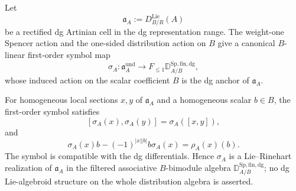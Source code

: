 \begin{construction}
\label{con:as-cellwise-spencer-symbol}
Let
\[
    \mathfrak a_A
    :=
    D_{B/R}^{\mathrm{Lie}}(A)
\]
be a rectified dg Artinian cell in the dg representation range.  The
weight-one Spencer action and the one-sided distribution action on $B$ give a
canonical $B$-linear first-order symbol map
\[
\boxed{
    \sigma_A:
    \mathfrak a_A^{\mathrm{und}}
    \longrightarrow
    F_{\le1}
    \mathbb D_{A/B}^{\mathrm{Sp,fin,dg}},
}
\]
whose induced action on the scalar coefficient $B$ is the dg anchor of
$\mathfrak a_A$.
\end{construction}

\begin{proposition}
\label{prop:as-binary-hurewicz-convolution}
For homogeneous local sections $x,y$ of $\mathfrak a_A$ and a homogeneous
scalar $b\in B$, the first-order symbol satisfies
\[
\boxed{
    [\sigma_A(x),\sigma_A(y)]
    =
    \sigma_A([x,y]),
}
\]
and
\[
\boxed{
    \sigma_A(x)b
    -
    (-1)^{|x||b|}b\sigma_A(x)
    =
    \rho_A(x)(b).
}
\]
The symbol is compatible with the dg differentials.  Hence $\sigma_A$ is a
Lie--Rinehart realization of $\mathfrak a_A$ in the filtered associative
$B$-bimodule algebra
$\mathbb D_{A/B}^{\mathrm{Sp,fin,dg}}$; no dg Lie-algebroid structure on the
whole distribution algebra is asserted.
\end{proposition}

